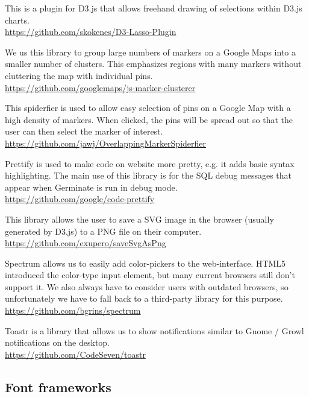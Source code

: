 \begin{description}[align=left,style=nextline,leftmargin=*,labelsep=\parindent,font=\bfseries]
	\item[lasso.js]  This is a plugin for D3.js that allows freehand drawing of selections within D3.js charts.\\\url{https://github.com/skokenes/D3-Lasso-Plugin}
	\item[MarkerClustererPlus] We us this library to group large numbers of markers on a Google Maps into a smaller number of clusters. This emphasizes regions with many markers without cluttering the map with individual pins.\\\url{https://github.com/googlemaps/js-marker-clusterer}
	\item[OverlappingMarkerSpiderfier] This spiderfier is used to allow easy selection of pins on a Google Map with a high density of markers. When clicked, the pins will be spread out so that the user can then select the marker of interest.\\\url{https://github.com/jawj/OverlappingMarkerSpiderfier}
	\item[prettify.js] Prettify is used to make code on website more pretty, e.g. it adds basic syntax highlighting. The main use of this library is for the SQL debug messages that appear when Germinate is run in debug mode.\\\url{https://github.com/google/code-prettify}
	\item[saveSvgAsPng.js] This library allows the user to save a SVG image in the browser (usually generated by D3.js) to a PNG file on their computer.\\\url{https://github.com/exupero/saveSvgAsPng}
	\item[Spectrum] Spectrum allows us to easily add color-pickers to the web-interface. HTML5 introduced the color-type input element, but many current browsers still don't support it. We also always have to consider users with outdated browsers, so unfortunately we have to fall back to a third-party library for this purpose.\\\url{https://github.com/bgrins/spectrum}
	\item[toastr] Toastr is a library that allows us to show notifications similar to Gnome / Growl notifications on the desktop. \\\url{https://github.com/CodeSeven/toastr}
\end{description}

\subsection{Font frameworks}

